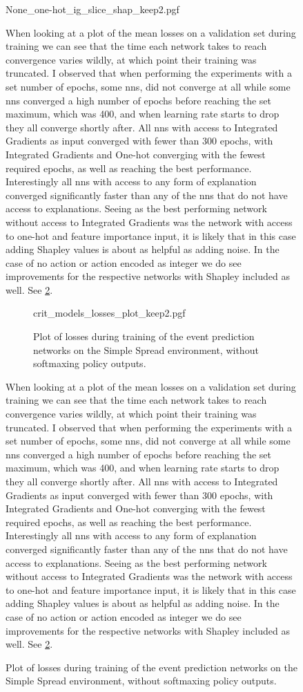 \documentclass[UKenglish]{uiomasterthesis}
\begin{document}
\begin{figure}[H]
    \centering
{None_one-hot_ig_slice_shap_keep2.pgf}

When looking at a plot of the mean losses on a validation set during training we can see that the time each network takes to reach convergence varies wildly, at which point their training was truncated. I observed that when performing the experiments with a set number of epochs, some \acp{nn}, did not converge at all while some \acp{nn} converged a high number of epochs before reaching the set maximum, which was 400, and when learning rate starts to drop they all converge shortly after. All \acp{nn} with access to Integrated Gradients as input converged with fewer than 300 epochs, with Integrated Gradients and One-hot converging with the fewest required epochs, as well as reaching the best performance. Interestingly all \acp{nn} with access to any form of explanation converged significantly faster than any of the \acp{nn} that do not have access to explanations. Seeing as the best performing network without access to Integrated Gradients was the network with access to one-hot and feature importance input, it is likely that in this case adding Shapley values is about as helpful as adding noise. In the case of no action or action encoded as integer we do see improvements for the respective networks with Shapley included as well. See \cref{fig:crit_losses}.

\begin{figure}[H]
    \centering
    {crit_models_losses_plot_keep2.pgf}
    \caption{Plot of losses during training of the event prediction networks on the Simple Spread environment, without softmaxing policy outputs.}
	\label{fig:crit_losses}
\end{figure}


When looking at a plot of the mean losses on a validation set during training we can see that the time each network takes to reach convergence varies wildly, at which point their training was truncated. I observed that when performing the experiments with a set number of epochs, some \acp{nn}, did not converge at all while some \acp{nn} converged a high number of epochs before reaching the set maximum, which was 400, and when learning rate starts to drop they all converge shortly after. All \acp{nn} with access to Integrated Gradients as input converged with fewer than 300 epochs, with Integrated Gradients and One-hot converging with the fewest required epochs, as well as reaching the best performance. Interestingly all \acp{nn} with access to any form of explanation converged significantly faster than any of the \acp{nn} that do not have access to explanations. Seeing as the best performing network without access to Integrated Gradients was the network with access to one-hot and feature importance input, it is likely that in this case adding Shapley values is about as helpful as adding noise. In the case of no action or action encoded as integer we do see improvements for the respective networks with Shapley included as well. See \cref{fig:crit_losses}.


\end{figure}
\end{document}
